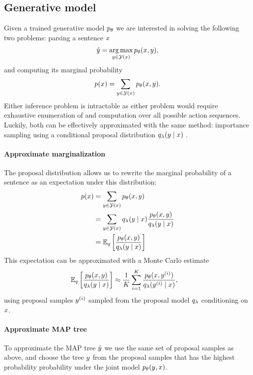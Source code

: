   \subsection{Generative model}
    Given a trained generative model $p_{\theta}$ we are interested in solving the following two problems: parsing a sentence $x$
    \begin{align*}
      \hat{y} = \operatorname*{arg\,max}_{ y \in \mathcal{Y}(x) } p_{\theta}(x, y),
    \end{align*}
    and computing its marginal probability
    \begin{align*}
      p(x) = \sum_{ y \in \mathcal{Y}(x) } p_{\theta}(x, y).
    \end{align*}
    Either inference problem is intractable as either problem would require exhaustive enumeration of and computation over all possible action sequences.  Luckily, both can be effectively approximated with the same method: importance sampling using a conditional proposal distribution $q_{\lambda}(y \mid x)$ \citep{dyer2016rnng}.

    \paragraph{Approximate marginalization}
    The proposal distribution allows us to rewrite the marginal probability of a sentence as an expectation under this distribution:
    \begin{align*}
      p (x)
        &= \sum_{y  \in \mathcal{Y}(x)} p_{\theta}(x, y) \\
        &= \sum_{y  \in \mathcal{Y}(x)} q_{\lambda}(y \mid x) \frac{p_{\theta}(x,y )}{q_{\lambda}(y \mid x)} \\
        &= \operatorname{\mathbb{E}}_{q} \bigg[\frac{p_{\theta}(x,y )}{q_{\lambda}(y \mid  x)} \bigg] \\
    \end{align*}
    This expectation can be approximated with a Monte Carlo estimate
    \begin{align}
      \operatorname{\mathbb{E}}_{q} \bigg[\frac{p_{\theta}(x,y )}{q_{\lambda}(y \mid x)} \bigg]
        &\approx \frac{1}{K}\sum_{i=1}^K  \frac{p_{\theta}( x, y^{(i)} )}{q_{\lambda}(y^{(i)} \mid x)},
    \end{align}
    using proposal samples $y^{(i)}$ sampled from the proposal model $q_{\lambda}$ conditioning on $x$.

    \paragraph{Approximate MAP tree}
    To approximate the MAP tree $\hat{y}$ we use the same set of proposal samples as above, and choose the tree $y$ from the proposal samples that has the highest probability probability under the joint model $p_{\theta}( y, x)$.

